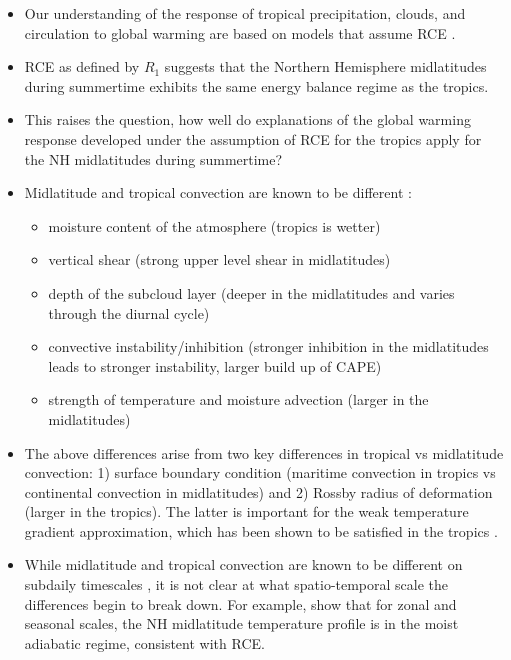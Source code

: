 \documentclass{article}
\begin{document}
\begin{itemize}
    \item Our understanding of the response of tropical precipitation, clouds, and circulation to global warming are based on models that assume RCE \citep{romps2011,popke2013,pendergrass2016,merlis2019}.
    \item RCE as defined by $R_1$ suggests that the Northern Hemisphere midlatitudes during summertime exhibits the same energy balance regime as the tropics.
    \item This raises the question, how well do explanations of the global warming response developed under the assumption of RCE for the tropics apply for the NH midlatitudes during summertime?
    \item Midlatitude and tropical convection are known to be different \citep{xu2000}:
        \begin{itemize}
            \item moisture content of the atmosphere (tropics is wetter)
            \item vertical shear (strong upper level shear in midlatitudes)
            \item depth of the subcloud layer (deeper in the midlatitudes and varies through the diurnal cycle)
            \item convective instability/inhibition (stronger inhibition in the midlatitudes leads to stronger instability, larger build up of CAPE) 
            \item strength of temperature and moisture advection (larger in the midlatitudes)
        \end{itemize}
    \item The above differences arise from two key differences in tropical vs midlatitude convection: 1) surface boundary condition (maritime convection in tropics vs continental convection in midlatitudes) and 2) Rossby radius of deformation (larger in the tropics). The latter is important for the weak temperature gradient approximation, which has been shown to be satisfied in the tropics \citep{pierrehumbert1995}.
    \item While midlatitude and tropical convection are known to be different on subdaily timescales \citep[e.g., in the context of parameterizing convection in GCMs][]{zhang2002, xie2002, zhang2003}, it is not clear at what spatio-temporal scale the differences begin to break down. For example, \cite{stone1979} show that for zonal and seasonal scales, the NH midlatitude temperature profile is in the moist adiabatic regime, consistent with RCE. 

\end{itemize}
\end{document}

